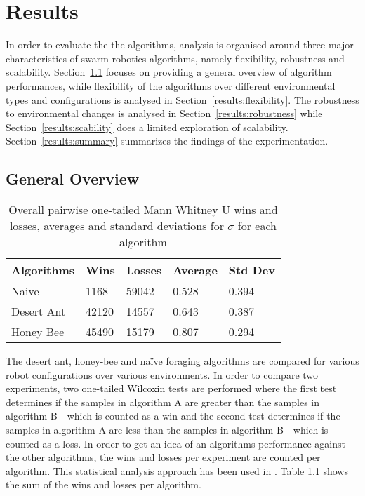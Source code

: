 \chapter{Results}
\label{chap:results}

In order to evaluate the the algorithms, analysis is organised around three major characteristics of swarm robotics algorithms, namely flexibility, robustness and scalability. Section~\ref{overview} focuses on providing a general overview of algorithm performances, while flexibility of the algorithms over different environmental types and configurations is analysed in Section~\ref{results:flexibility}. The robustness to environmental changes is analysed in Section~\ref{results:robustness} while Section~\ref{results:scability} does a limited exploration of scalability. Section~\ref{results:summary} summarizes the findings of the experimentation. 

\section{General Overview}
\label{overview}

\begin{table}
\centering
    \caption{Overall pairwise one-tailed Mann Whitney U wins and losses, averages and standard deviations for $\sigma$ for each algorithm}
        \label{summarytable}
    \begin{tabular}{l|llll}
    \hline \hline
    Algorithms & Wins & Losses & Average & Std Dev \\ \hline
    Naive      & 1168    & 59042 & 0.528   & 0.394  \\
    Desert Ant  & 42120 & 14557 & 0.643   & 0.387  \\
    Honey Bee   & 45490 & 15179 & 0.807   & 0.294  \\
    \hline
    \end{tabular}
\end{table}

The desert ant, honey-bee and na\"ive foraging algorithms are compared for various robot configurations over various environments. In order to compare two experiments, two one-tailed Wilcoxin tests are performed where the first test determines if the samples in algorithm A are greater than the samples in algorithm B - which is counted as a win and the second test determines if the samples in algorithm A are less than the samples in algorithm B - which is counted as a loss. In order to get an idea of an algorithms performance against the other algorithms, the wins and losses per experiment are counted per algorithm. This statistical analysis approach has been used in \cite{helbig2013performance}. Table \ref{summarytable} shows the sum of the wins and losses per algorithm.

